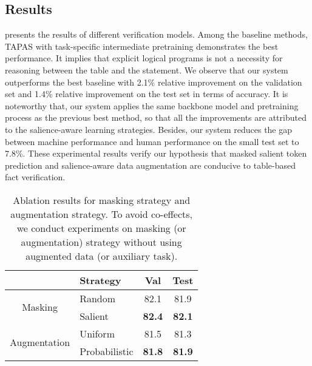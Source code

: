\documentclass[11pt]{article}
\newcommand{\stitle}[1]{\vspace{0.3em} \noindent{\bf #1.}}
\begin{document}
\subsection{Results}\label{sec:result}

\stitle{Overall Performance}
 presents the results of different verification models. 
Among the baseline methods, TAPAS with task-specific intermediate pretraining demonstrates the best performance. It implies that explicit logical programs is not a necessity for reasoning between the table and the statement.
We observe that our system outperforms the best baseline with 2.1\% relative improvement on the validation set and 1.4\% relative improvement on the test set in terms of accuracy.
It is noteworthy that, our system applies the same backbone model and pretraining process as the previous best method, so that all the improvements are attributed to the salience-aware learning strategies.
Besides, our system reduces the gap between machine performance and human performance on the small test set to 7.8\%.
These experimental results verify our hypothesis that masked salient token prediction and salience-aware data augmentation are conducive to table-based fact verification.




\begin{table}[h]
\small
\centering
\begin{tabular}{c|l|cc}
\toprule
 & Strategy & Val & Test   \\ \midrule
\multirow{2}{*}{Masking} & Random  & 82.1 & 81.9 \\
& Salient  & \textbf{82.4} & \textbf{82.1} \\ \midrule
\multirow{2}{*}{Augmentation} & Uniform  & 81.5 & 81.3 \\
& Probabilistic  & \textbf{81.8} & \textbf{81.9} \\
\bottomrule
\end{tabular}
\caption{
Ablation results for masking strategy and augmentation strategy.
To avoid co-effects, we conduct experiments on  masking (or augmentation) strategy  without using augmented data (or auxiliary task).}
\label{table:ablation}
\end{table} 
\end{document}
